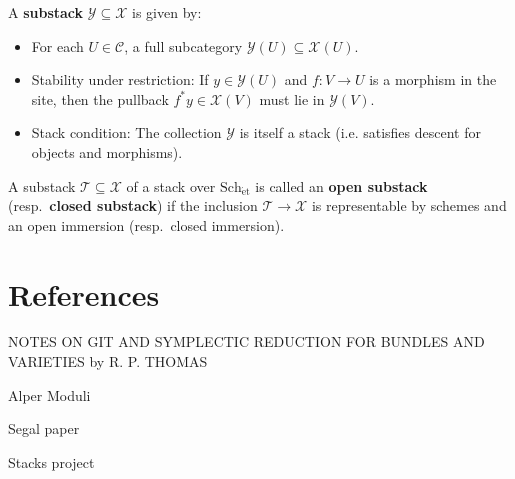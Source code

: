 \documentclass[12pt]{article}
\begin{document}
\begin{definition}[Substack]
  A \textbf{substack} $\mathcal{Y}\subseteq \mathcal{X}$ is given by:
  \begin{itemize}
    \item For each $U\in\mathcal{C}$, a full subcategory $\mathcal{Y}(U)\subseteq \mathcal{X}(U)$.
    \item Stability under restriction:
          If $y\in \mathcal{Y}(U)$ and $f:V\to U$ is a morphism in the site, then the pullback $f^*y \in \mathcal{X}(V)$ must lie in $\mathcal{Y}(V)$.
    \item Stack condition:
          The collection $\mathcal{Y}$ is itself a stack (i.e. satisfies descent for objects and morphisms).
  \end{itemize}
\end{definition}

\begin{definition}\label{def:open-closed-substacks}
  A substack $\mathcal{T} \subseteq \mathcal{X}$ of a stack over $\mathrm{Sch}_{\mathrm{\acute{e}t}}$
  is called an \textbf{open substack} (resp.\ \textbf{closed substack}) if the inclusion
  $\mathcal{T} \to \mathcal{X}$ is representable by schemes and an open immersion (resp.\ closed immersion).
\end{definition}

\section{References}
NOTES ON GIT AND SYMPLECTIC REDUCTION FOR
BUNDLES AND VARIETIES
by R. P. THOMAS

Alper Moduli

Segal paper

Stacks project
\end{document}
